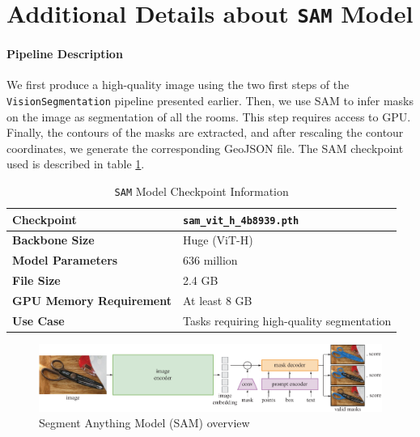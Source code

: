 \documentclass[11pt]{article}
\begin{document}

\section{Additional Details about \texttt{SAM} Model}
\label{app:sec:SAMdetails}

\paragraph{Pipeline Description} 
We first produce a high-quality image using the 
two first steps of the \texttt{VisionSegmentation} pipeline presented earlier.
Then, we use SAM to infer masks on 
the image as segmentation of all the rooms. This step requires access to GPU.
Finally, the contours of the masks 
are extracted, and after rescaling the contour coordinates, we generate the 
corresponding GeoJSON file. The SAM checkpoint used is described in table
\ref{tab:SAM_model_checkpoint}.

\begin{table}[htb!]
    \centering
    \begin{tabular}{|l|l|}
        \hline
        \textbf{Checkpoint} & \texttt{sam\_vit\_h\_4b8939.pth} \\ \hline
        \textbf{Backbone Size} & Huge (ViT-H) \\ \hline
        \textbf{Model Parameters} & 636 million \\ \hline
        \textbf{File Size} & 2.4 GB \\ \hline
        \textbf{GPU Memory Requirement} & At least 8 GB \\ \hline
        \textbf{Use Case} & Tasks requiring high-quality segmentation \\ \hline
    \end{tabular}
    \caption{\texttt{SAM} Model Checkpoint Information}
    \label{tab:SAM_model_checkpoint}
\end{table}


\begin{figure}[htb!]
    \centering
    \includegraphics[width=0.9\linewidth]{figures/SAM_model_diagram.pdf}
    \caption{Segment Anything Model (SAM) overview}
    \label{fig:SAMmodel_diagram}
\end{figure}
\end{document}
